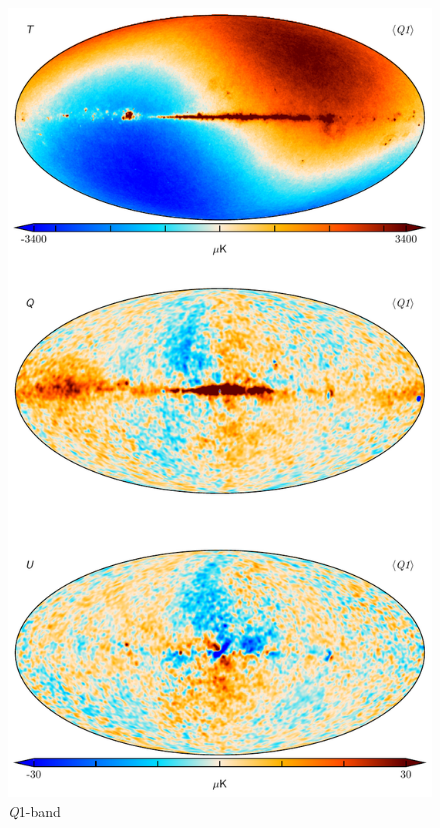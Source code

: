 \documentclass[twocolumn]{../../common/aa}
\newcommand{\Q}[0]{\textit Q}
\begin{document}
\begin{figure}
	\centering
	\includegraphics[height=0.9\textheight]{figures/040-WMAP_Q1_map.pdf}
	\caption{\Q1-band}
\end{figure}
\end{document}
